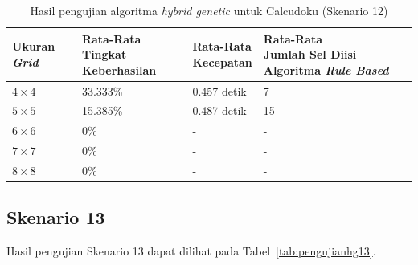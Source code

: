 \begin{table}
\centering
\captionsetup{justification=centering}
\caption[Hasil pengujian algoritma \textit{hybrid genetic} untuk Calcudoku (Skenario 12)]{Hasil pengujian algoritma \textit{hybrid genetic} untuk Calcudoku (Skenario 12)}
\begin{tabular}{| l | l | l | l |}
\hline
Ukuran \textit{Grid} & \makecell[c]{Rata-Rata \\ Tingkat Keberhasilan} & \makecell[c]{Rata-Rata \\ Kecepatan} & \makecell[c]{Rata-Rata \\ Jumlah Sel Diisi Algoritma \textit{Rule Based}} \\
\hline \hline
\begin{math}4 \times 4\end{math} & 33.333\% & 0.457 detik & 7 \\
\hline
\begin{math}5 \times 5\end{math} & 15.385\% & 0.487 detik & 15 \\
\hline
\begin{math}6 \times 6\end{math} & 0\% & - & - \\
\hline
\begin{math}7 \times 7\end{math} & 0\% & - & - \\
\hline
\begin{math}8 \times 8\end{math} & 0\% & - & - \\
\hline
\end{tabular}
\label{tab:pengujianhg12}
\end{table}

\subsection{Skenario 13}
\label{sec:skenario13}

Hasil pengujian Skenario 13 dapat dilihat pada Tabel~\ref{tab:pengujianhg13}.

